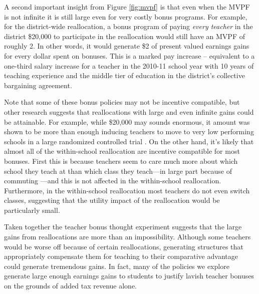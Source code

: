 \documentclass[12pt]{article}
\theoremstyle{definition}
\theoremstyle{definition}
\theoremstyle{definition}
\theoremstyle{definition}
\begin{document}
A second important insight from Figure \ref{fig:mvpf} is that even when the MVPF is not infinite it is still large even for very costly bonus programs. For example, for the district-wide reallocation, a bonus program of paying \textit{every teacher} in the district \$20,000 to participate in the reallocation would still have an MVPF of roughly 2. In other words, it would generate \$2 of present valued earnings gains for every dollar spent on bonuses. This is a marked pay increase -- equivalent to a one-third salary increase for a teacher in the 2010-11 school year with 10 years of teaching experience and the middle tier of education in the district's collective bargaining agreement. 

Note that some of these bonus policies may not be incentive compatible, but other research suggests that reallocations with large and even infinite gains could be attainable. For example, while \$20,000 may sounds enormous, it amount was shown to be more than enough inducing teachers to move to very low performing schools in a large randomized controlled trial \citep{glazerman2013transfer}.
On the other hand, it's likely that almost all of the within-school reallocation are incentive compatible for most bonuses. First this is because teachers seem to care much more about which school they teach at than which class they teach---in large part because of commuting \citep{bates2022teacher}---and this is not affected in the within-school reallocation. Furthermore, in the within-school reallocation most teachers do not even switch classes, suggesting that the utility impact of the reallocation would be particularly small.


Taken together the teacher bonus thought experiment suggests that the large gains from reallocations are more than an impossibility. Although some teachers would be worse off because of certain reallocations, generating structures that appropriately compensate them for teaching to their comparative advantage could generate tremendous gains. In fact, many of the policies we explore generate large enough earnings gains to students to justify lavish teacher bonuses on the grounds of added tax revenue alone.
\end{document}
